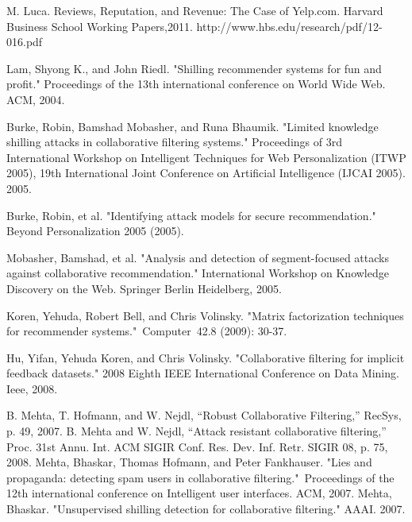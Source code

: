\documentclass[master,english,final]{kaist-ucs}
\begin{document}
\begin{thebibliography}{00}


 M. Luca. Reviews, Reputation, and Revenue: The Case of Yelp.com. Harvard Business School Working Papers,2011. http://www.hbs.edu/research/pdf/12-016.pdf

 Lam, Shyong K., and John Riedl. "Shilling recommender systems for fun and profit." Proceedings of the 13th international conference on World Wide Web. ACM, 2004.

 Burke, Robin, Bamshad Mobasher, and Runa Bhaumik. "Limited knowledge shilling attacks in collaborative filtering systems." Proceedings of 3rd International Workshop on Intelligent Techniques for Web Personalization (ITWP 2005), 19th International Joint Conference on Artificial Intelligence (IJCAI 2005). 2005.

 Burke, Robin, et al. "Identifying attack models for secure recommendation." Beyond Personalization 2005 (2005).

 Mobasher, Bamshad, et al. "Analysis and detection of segment-focused attacks against collaborative recommendation." International Workshop on Knowledge Discovery on the Web. Springer Berlin Heidelberg, 2005.

 Koren, Yehuda, Robert Bell, and Chris Volinsky. "Matrix factorization techniques for recommender systems." Computer 42.8 (2009): 30-37.

 Hu, Yifan, Yehuda Koren, and Chris Volinsky. "Collaborative filtering for implicit feedback datasets." 2008 Eighth IEEE International Conference on Data Mining. Ieee, 2008.

 B. Mehta, T. Hofmann, and W. Nejdl, “Robust Collaborative Filtering,” RecSys, p. 49, 2007.
 B. Mehta and W. Nejdl, “Attack resistant collaborative filtering,” Proc. 31st Annu. Int. ACM SIGIR Conf. Res. Dev. Inf. Retr. SIGIR 08, p. 75, 2008.
 Mehta, Bhaskar, Thomas Hofmann, and Peter Fankhauser. "Lies and propaganda: detecting spam users in collaborative filtering." Proceedings of the 12th international conference on Intelligent user interfaces. ACM, 2007.
 Mehta, Bhaskar. "Unsupervised shilling detection for collaborative filtering." AAAI. 2007.


\end{thebibliography}
\end{document}
